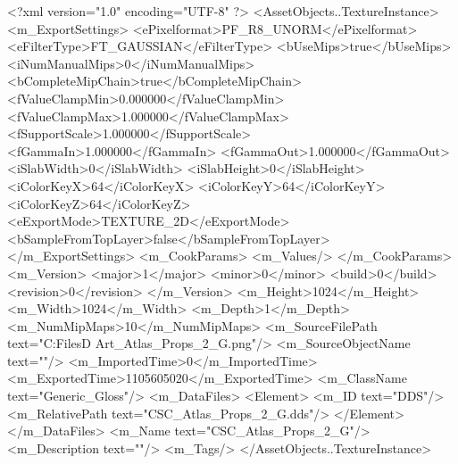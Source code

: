 <?xml version="1.0" encoding="UTF-8" ?>
<AssetObjects..TextureInstance>
	<m_ExportSettings>
		<ePixelformat>PF_R8_UNORM</ePixelformat>
		<eFilterType>FT_GAUSSIAN</eFilterType>
		<bUseMips>true</bUseMips>
		<iNumManualMips>0</iNumManualMips>
		<bCompleteMipChain>true</bCompleteMipChain>
		<fValueClampMin>0.000000</fValueClampMin>
		<fValueClampMax>1.000000</fValueClampMax>
		<fSupportScale>1.000000</fSupportScale>
		<fGammaIn>1.000000</fGammaIn>
		<fGammaOut>1.000000</fGammaOut>
		<iSlabWidth>0</iSlabWidth>
		<iSlabHeight>0</iSlabHeight>
		<iColorKeyX>64</iColorKeyX>
		<iColorKeyY>64</iColorKeyY>
		<iColorKeyZ>64</iColorKeyZ>
		<eExportMode>TEXTURE_2D</eExportMode>
		<bSampleFromTopLayer>false</bSampleFromTopLayer>
	</m_ExportSettings>
	<m_CookParams>
		<m_Values/>
	</m_CookParams>
	<m_Version>
		<major>1</major>
		<minor>0</minor>
		<build>0</build>
		<revision>0</revision>
	</m_Version>
	<m_Height>1024</m_Height>
	<m_Width>1024</m_Width>
	<m_Depth>1</m_Depth>
	<m_NumMipMaps>10</m_NumMipMaps>
	<m_SourceFilePath text="C:\Users\Shadow\Desktop\Working Files\3D Art\Textures\CSC_Atlas_Props_2_G.png"/>
	<m_SourceObjectName text=""/>
	<m_ImportedTime>0</m_ImportedTime>
	<m_ExportedTime>1105605020</m_ExportedTime>
	<m_ClassName text="Generic_Gloss"/>
	<m_DataFiles>
		<Element>
			<m_ID text="DDS"/>
			<m_RelativePath text="CSC_Atlas_Props_2_G.dds"/>
		</Element>
	</m_DataFiles>
	<m_Name text="CSC_Atlas_Props_2_G"/>
	<m_Description text=""/>
	<m_Tags/>
</AssetObjects..TextureInstance>

